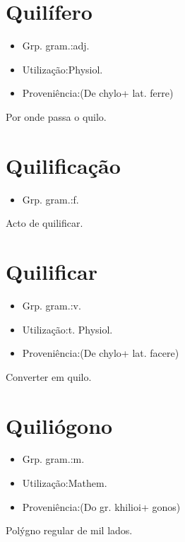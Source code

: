 \section{Quilífero}
\begin{itemize}
\item {Grp. gram.:adj.}
\end{itemize}
\begin{itemize}
\item {Utilização:Physiol.}
\end{itemize}
\begin{itemize}
\item {Proveniência:(De \textunderscore chylo\textunderscore  + lat. \textunderscore ferre\textunderscore )}
\end{itemize}
Por onde passa o quilo.
\section{Quilificação}
\begin{itemize}
\item {Grp. gram.:f.}
\end{itemize}
Acto de quilificar.
\section{Quilificar}
\begin{itemize}
\item {Grp. gram.:v.}
\end{itemize}
\begin{itemize}
\item {Utilização:t. Physiol.}
\end{itemize}
\begin{itemize}
\item {Proveniência:(De \textunderscore chylo\textunderscore  + lat. \textunderscore facere\textunderscore )}
\end{itemize}
Converter em quilo.
\section{Quiliógono}
\begin{itemize}
\item {Grp. gram.:m.}
\end{itemize}
\begin{itemize}
\item {Utilização:Mathem.}
\end{itemize}
\begin{itemize}
\item {Proveniência:(Do gr. \textunderscore khilioi\textunderscore  + \textunderscore gonos\textunderscore )}
\end{itemize}
Polýgno regular de mil lados.
